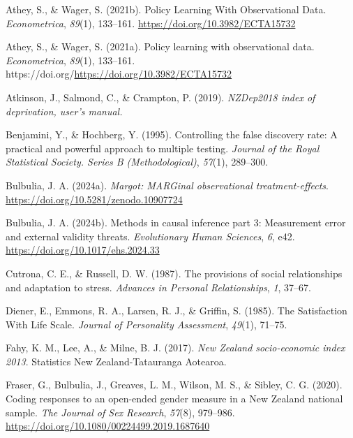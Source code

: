 \documentclass[
  single column]{article}
\newlength{\cslhangindent}
\newenvironment{CSLReferences}[2] %
 {\begin{list}{}{%
  \setlength{\itemindent}{0pt}
  \setlength{\leftmargin}{0pt}
  \setlength{\parsep}{0pt}
  \ifodd #1
   \setlength{\leftmargin}{\cslhangindent}
   \setlength{\itemindent}{-1\cslhangindent}
  \fi
  \setlength{\itemsep}{#2\baselineskip}}}
 {\end{list}}
\begin{document}
\label{refs}
\begin{CSLReferences}{1}{0}
Athey, S., \& Wager, S. (2021b). Policy Learning With Observational
Data. \emph{Econometrica}, \emph{89}(1), 133--161.
\url{https://doi.org/10.3982/ECTA15732}

Athey, S., \& Wager, S. (2021a). Policy learning with observational
data. \emph{Econometrica}, \emph{89}(1), 133--161.
https://doi.org/\url{https://doi.org/10.3982/ECTA15732}

Atkinson, J., Salmond, C., \& Crampton, P. (2019). \emph{NZDep2018 index
of deprivation, user{'}s manual.}

Benjamini, Y., \& Hochberg, Y. (1995). Controlling the false discovery
rate: A practical and powerful approach to multiple testing.
\emph{Journal of the Royal Statistical Society. Series B
(Methodological)}, \emph{57}(1), 289--300.

Bulbulia, J. A. (2024a). \emph{Margot: MARGinal observational
treatment-effects}. \url{https://doi.org/10.5281/zenodo.10907724}

Bulbulia, J. A. (2024b). Methods in causal inference part 3: Measurement
error and external validity threats. \emph{Evolutionary Human Sciences},
\emph{6}, e42. \url{https://doi.org/10.1017/ehs.2024.33}

Cutrona, C. E., \& Russell, D. W. (1987). The provisions of social
relationships and adaptation to stress. \emph{Advances in Personal
Relationships}, \emph{1}, 37--67.

Diener, E., Emmons, R. A., Larsen, R. J., \& Griffin, S. (1985). The
Satisfaction With Life Scale. \emph{Journal of Personality Assessment},
\emph{49}(1), 71--75.

Fahy, K. M., Lee, A., \& Milne, B. J. (2017). \emph{{N}ew {Z}ealand
socio-economic index 2013}. Statistics New Zealand-Tatauranga Aotearoa.

Fraser, G., Bulbulia, J., Greaves, L. M., Wilson, M. S., \& Sibley, C.
G. (2020). Coding responses to an open-ended gender measure in a {N}ew
{Z}ealand national sample. \emph{The Journal of Sex Research},
\emph{57}(8), 979--986.
\url{https://doi.org/10.1080/00224499.2019.1687640}


\end{CSLReferences}
\end{document}

